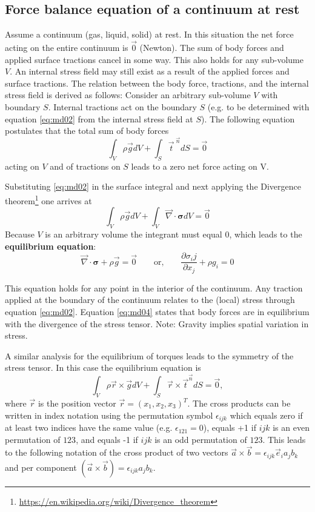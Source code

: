 \subsection{Force balance equation of a continuum at rest} 

Assume a continuum (gas, liquid, solid)
at rest. In this situation the net force acting on the entire 
continuum is $\vec{0}$ (Newton). The
sum of body forces and applied surface tractions cancel in some way. 
This also holds for
any sub-volume $V$. An internal stress field may still exist 
as a result of the applied forces
and surface tractions. The relation between the body force, tractions, 
and the internal
stress field is derived as follows: 
Consider an arbitrary sub-volume $V$ with boundary $S$.
Internal tractions act on the boundary $S$ 
(e.g. to be determined with equation \eqref{eq:md02} from the
internal stress field at $S$). 
The following equation postulates that the total sum of body
forces
\begin{equation}
\int_V \rho \vec{g} dV + \int_S \vec{t}^{\; \vec n} dS = \vec{0}
\label{eq:md03}
\end{equation}
acting on $V$ and of tractions on $S$ leads to a zero net
force acting on V.

Substituting \eqref{eq:md02} in the surface integral and next 
applying the Divergence 
theorem\footnote{\url{https://en.wikipedia.org/wiki/Divergence_theorem}}
one arrives at
\[
\int_V \rho \vec{g} dV + \int_V \vec\nabla \cdot {\bm\sigma} dV = \vec{0}
\]
Because $V$ is an
arbitrary volume the integrant must equal 0, which leads to the 
{\bf equilibrium equation}:
\begin{equation}
\vec\nabla \cdot {\bm\sigma} +  \rho \vec{g} = \vec{0} 
\qquad
\text{or,}
\qquad
\frac{\partial \sigma_ij}{\partial x_j} + \rho g_i = 0
\label{eq:md04}
\end{equation}

This equation holds for any point in the interior of the continuum. 
Any traction applied at the boundary of the continuum relates to 
the (local) stress through equation \eqref{eq:md02}. Equation
\eqref{eq:md04} states that body forces are in equilibrium 
with the divergence of the stress tensor.
Note: Gravity implies spatial variation in stress.

A similar analysis for the equilibrium of torques leads to the symmetry of the stress
tensor. In this case the equilibrium equation is
\[
\int_V \rho \vec{r} \times \vec{g}  dV 
+ 
\int_S \vec{r} \times \vec{t}^{\vec n} dS = \vec{0},
\]
where $\vec{r}$ is the position vector 
$\vec{r}=(x_1,x_2,x_3)^T$. The cross products can be written in
index notation using the permutation symbol $\epsilon_{ijk}$
which equals zero if at least two indices
have the same value (e.g. $\epsilon_{121}=0$), 
equals +1 if $ijk$ is an even permutation of $123$, 
and
equals -1 if $ijk$ is an odd permutation of $123$. 
This leads to the following notation of the
cross product of two vectors 
$\vec{a}\times \vec{b}= \epsilon_{ijk} \vec{e}_i a_j b_k$
and per component 
$(\vec{a}\times \vec{b})=\epsilon_{ijk} a_j b_k$.

